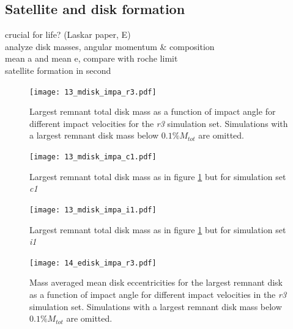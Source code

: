 \subsection{Satellite and disk formation}
crucial for life? (Laskar paper, E)\\
analyze disk masses, angular momentum \& composition \\
mean a and mean e, compare with roche limit \\
satellite formation in second \\

\begin{landscape}
\begin{figure}
\begin{center}
\texttt{[image: 13\_mdisk\_impa\_r3.pdf]}
\caption{Largest remnant total disk mass as a function of impact angle for different impact velocities for the \emph{r3} simulation set. Simulations with a largest remnant disk mass below $0.1\% M_{tot}$ are omitted.}
\label{ch03_fig13a}
\end{center}
\end{figure}

\begin{figure}
\begin{center}
\texttt{[image: 13\_mdisk\_impa\_c1.pdf]}
\caption{Largest remnant total disk mass as in figure \ref{ch03_fig13a} but for simulation set \emph{c1}}
\label{ch03_fig13b}
\end{center}
\end{figure}

\begin{figure}
\begin{center}
\texttt{[image: 13\_mdisk\_impa\_i1.pdf]}
\caption{Largest remnant total disk mass as in figure \ref{ch03_fig13a} but for simulation set \emph{i1}}
\label{ch03_fig13c}
\end{center}
\end{figure}

\begin{figure}
\begin{center}
\texttt{[image: 14\_edisk\_impa\_r3.pdf]}
\caption{Mass averaged mean disk eccentricities for the largest remnant disk as a function of impact angle for different impact velocities in the \emph{r3} simulation set. Simulations with a largest remnant disk mass below $0.1\% M_{tot}$ are omitted.}
\label{ch03_fig14a}
\end{center}
\end{figure}


\end{landscape}
